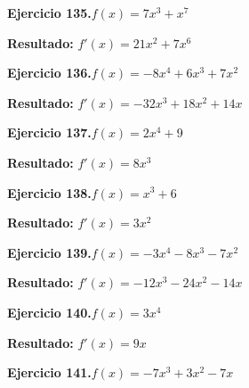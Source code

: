 \documentclass[10pt,a4paper]{article}
\begin{document}
\begin{ejbox}
\textbf{Ejercicio 135.}\quad $f(x) = 7x^{3} + x^{7}$
\end{ejbox}

\begin{solbox}
\textbf{Resultado:} \(\displaystyle f'(x) = 21x^{2} + 7x^{6}\)
\end{solbox}

\newpage
\begin{ejbox}
\textbf{Ejercicio 136.}\quad $f(x) = -8x^4 +6x^3 +7x^2$
\end{ejbox}

\begin{solbox}
\textbf{Resultado:} \(\displaystyle f'(x) = -32x^3 +18x^2 +14x\)
\end{solbox}

\begin{ejbox}
\textbf{Ejercicio 137.}\quad $f(x) = 2x^{4} +9$
\end{ejbox}

\begin{solbox}
\textbf{Resultado:} \(\displaystyle f'(x) = 8x^{3}\)
\end{solbox}

\begin{ejbox}
\textbf{Ejercicio 138.}\quad $f(x) = x^{3} +6$
\end{ejbox}

\begin{solbox}
\textbf{Resultado:} \(\displaystyle f'(x) = 3x^{2}\)
\end{solbox}

\newpage
\begin{ejbox}
\textbf{Ejercicio 139.}\quad $f(x) = -3x^4 -8x^3 -7x^2$
\end{ejbox}

\begin{solbox}
\textbf{Resultado:} \(\displaystyle f'(x) = -12x^3 -24x^2 -14x\)
\end{solbox}

\begin{ejbox}
\textbf{Ejercicio 140.}\quad $f(x) = 3x^{4}$
\end{ejbox}

\begin{solbox}
\textbf{Resultado:} \(\displaystyle f'(x) = 9x\)
\end{solbox}

\begin{ejbox}
\textbf{Ejercicio 141.}\quad $f(x) = -7x^3 +3x^2 -7x$
\end{ejbox}
\end{document}
